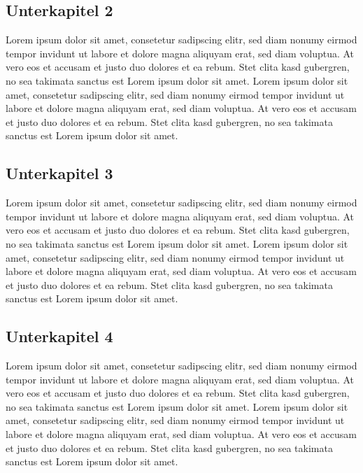 		\subsection{Unterkapitel 2}
			\label{subsec:Unterkapitel2}
		
			Lorem ipsum dolor sit amet, consetetur sadipscing elitr, sed diam nonumy eirmod tempor invidunt ut labore et dolore magna aliquyam erat, sed diam voluptua. At vero eos et accusam et justo duo dolores et ea rebum. Stet clita kasd gubergren, no sea takimata sanctus est Lorem ipsum dolor sit amet. Lorem ipsum dolor sit amet, consetetur sadipscing elitr, sed diam nonumy eirmod tempor invidunt ut labore et dolore magna aliquyam erat, sed diam voluptua. At vero eos et accusam et justo duo dolores et ea rebum. Stet clita kasd gubergren, no sea takimata sanctus est Lorem ipsum dolor sit amet.
			
		\subsection{Unterkapitel 3}
			\label{subsec:Unterkapitel3}
				
			Lorem ipsum dolor sit amet, consetetur sadipscing elitr, sed diam nonumy eirmod tempor invidunt ut labore et dolore magna aliquyam erat, sed diam voluptua. At vero eos et accusam et justo duo dolores et ea rebum. Stet clita kasd gubergren, no sea takimata sanctus est Lorem ipsum dolor sit amet. Lorem ipsum dolor sit amet, consetetur sadipscing elitr, sed diam nonumy eirmod tempor invidunt ut labore et dolore magna aliquyam erat, sed diam voluptua. At vero eos et accusam et justo duo dolores et ea rebum. Stet clita kasd gubergren, no sea takimata sanctus est Lorem ipsum dolor sit amet.
			
		\subsection{Unterkapitel 4}
			\label{subsec:Unterkapitel4}
			
			Lorem ipsum dolor sit amet, consetetur sadipscing elitr, sed diam nonumy eirmod tempor invidunt ut labore et dolore magna aliquyam erat, sed diam voluptua. At vero eos et accusam et justo duo dolores et ea rebum. Stet clita kasd gubergren, no sea takimata sanctus est Lorem ipsum dolor sit amet. Lorem ipsum dolor sit amet, consetetur sadipscing elitr, sed diam nonumy eirmod tempor invidunt ut labore et dolore magna aliquyam erat, sed diam voluptua. At vero eos et accusam et justo duo dolores et ea rebum. Stet clita kasd gubergren, no sea takimata sanctus est Lorem ipsum dolor sit amet.
